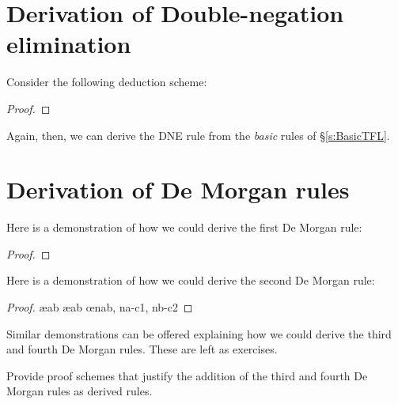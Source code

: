 \section{Derivation of Double-negation elimination}
Consider the following deduction scheme:
	\begin{proof}
	\open
	\close
	\open
	\close
\end{proof}
Again, then, we can derive the DNE rule from the \emph{basic} rules of \S\ref{s:BasicTFL}.

\section{Derivation of De Morgan rules}
Here is a demonstration of how we could derive the first De Morgan rule:
 	\begin{proof}
		\open
			\open
			\close
		\close
		\open
		\close
	\end{proof}
Here is a demonstration of how we could derive the second De Morgan rule:
 	\begin{proof}
		\open
			\ae{ab}
			\ae{ab}
			\open
			\close
			\open
			\close
			\oe{nab, na-c1, nb-c2}
		\close
	\end{proof}
Similar demonstrations can be offered explaining how we could derive the third and fourth De Morgan rules. These are left as exercises.

\practiceproblems

\problempart
Provide proof schemes that justify the addition of the third and fourth De Morgan rules as derived rules. 

